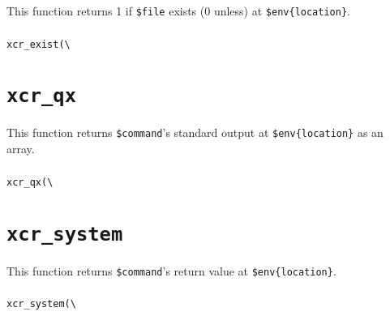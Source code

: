 \documentclass[a4paper,10pt]{report}
\def\|{\verb|} %|
\begin{document}
This function returns 1 if \texttt{\$file} exists (0 unless) at
\texttt{\$env\{location\}}.

\subsubsection{\format}

\begin{boxnote}
\begin{alltt}
xcr_exist(\|\|%\textit{env}, $file);
\end{alltt}
\end{boxnote}
\vspace{\baselineskip}

\section{\texttt{xcr\_qx}}

This function returns \texttt{\$command}'s standard output at
\texttt{\$env\{location\}} as an array.

\subsubsection{\format}

\begin{boxnote}
\begin{alltt}
xcr_qx(\|\|%\textit{env}, $command);
\end{alltt}
\end{boxnote}
\vspace{\baselineskip}

\section{\texttt{xcr\_system}}

This function returns \texttt{\$command}'s return value at
\texttt{\$env\{location\}}.

\subsubsection{\format}

\begin{boxnote}
\begin{alltt}
xcr_system(\|\|%\textit{env}, $command);
\end{alltt}
\end{boxnote}
\vspace{\baselineskip}
\end{document}

